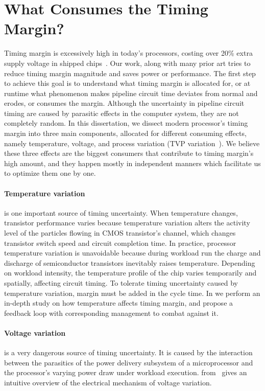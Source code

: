 \section{What Consumes the Timing Margin?}
\label{sec:background:components}

Timing margin is excessively high in today's processors, costing over 20\% extra supply voltage in shipped chips~\cite{reddi2010voltage, leng2015gpu}. Our work, along with many prior art tries to reduce timing margin magnitude and saves power or performance. The first step to achieve this goal is to understand what timing margin is allocated for, or at runtime what phenomenon makes pipeline circuit time deviates from normal and erodes, or consumes the margin. Although the uncertainty in pipeline circuit timing are caused by parasitic effects in the computer system, they are not completely random. In this dissertation, we dissect modern processor's timing margin into three main components, allocated for different consuming effects, namely temperature, voltage, and process variation (TVP variation~\cite{reddi2013resilient}). We believe these three effects are the biggest consumers that contribute to timing margin's high amount, and they happen mostly in independent manners which facilitate us to optimize them one by one.

\paragraph{Temperature variation} is one important source of timing uncertainty. When temperature changes, transistor performance varies because temperature variation alters the activity level of the particles flowing in CMOS transistor's channel, which changes transistor switch speed and circuit completion time. In practice, processor temperature variation is unavoidable because during workload run the charge and discharge of semiconductor transistors inevitably raises temperature. Depending on workload intensity, the temperature profile of the chip varies temporarily and spatially, affecting circuit timing. To tolerate timing uncertainty caused by temperature variation, margin must be added in the cycle time. In  we perform an in-depth study on how temperature affects timing margin, and propose a feedback loop with corresponding management to combat against it.

\paragraph{Voltage variation} is a very dangerous source of timing uncertainty. It is caused by the interaction between the parasitics of the power delivery subsystem of a microprocessor and the processor's varying power draw under workload execution.  from~\cite{leng2014gpuvolt} gives an intuitive overview of the electrical mechanism of voltage variation.

